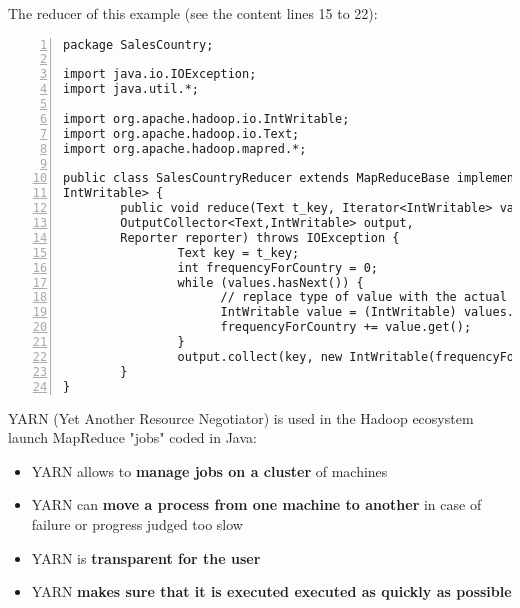 \documentclass{beamer}[10pt, usepdftitle=false handout]
\begin{document}
\begin{frame}[fragile]
The reducer of this example (see the content lines 15 to 22):
\vspace*{0.6em}

\begingroup
\fontsize{6pt}{8pt}\selectfont
\begin{Verbatim}[numbers=left,xleftmargin=5mm]
package SalesCountry;

import java.io.IOException;
import java.util.*;

import org.apache.hadoop.io.IntWritable;
import org.apache.hadoop.io.Text;
import org.apache.hadoop.mapred.*;

public class SalesCountryReducer extends MapReduceBase implements Reducer<Text, IntWritable, Text, 
IntWritable> {
        public void reduce(Text t_key, Iterator<IntWritable> values, 
        OutputCollector<Text,IntWritable> output, 
        Reporter reporter) throws IOException {
                Text key = t_key;
                int frequencyForCountry = 0;
                while (values.hasNext()) {
                      // replace type of value with the actual type of our value
                      IntWritable value = (IntWritable) values.next();
                      frequencyForCountry += value.get();                       
                }
                output.collect(key, new IntWritable(frequencyForCountry));
        }
}
\end{Verbatim}
\endgroup

\end{frame}
\begin{frame}
YARN (Yet Another Resource Negotiator) is used in the Hadoop ecosystem launch MapReduce "jobs" coded in Java:
\vspace*{0.6em}

\begin{itemize}
\item{YARN allows to \textbf{manage jobs on a cluster} of machines}
\item{YARN can \textbf{move a process from one machine to another} in case of failure or progress judged too slow}
\item{YARN is \textbf{transparent for the user}}
\item{YARN \textbf{makes sure that it is executed executed as quickly as possible}}
\end{itemize}

\end{frame}
\end{document}
